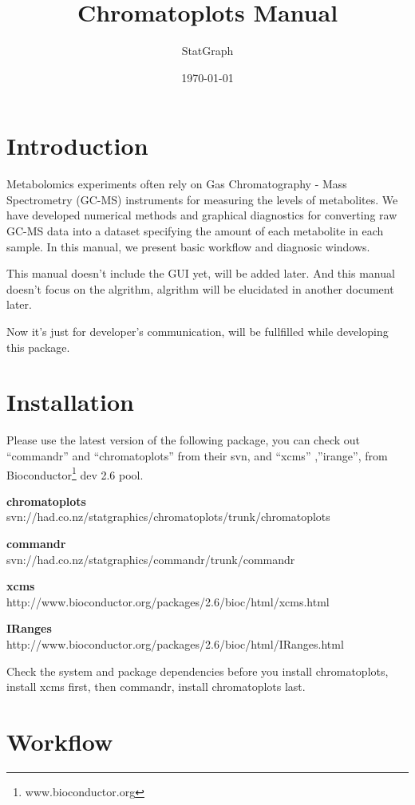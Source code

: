 \documentclass[11pt,a4paper]{article}
\title{Chromatoplots Manual}
\author{StatGraph}
\date{\today}
\begin{document}
\maketitle\newpage
\tableofcontents\newpage

\section{Introduction}
Metabolomics experiments often rely on Gas Chromatography - Mass
Spectrometry (GC-MS) instruments for measuring the levels of
metabolites. We have developed numerical methods and graphical
diagnostics for converting raw GC-MS data into a dataset specifying
the amount of each metabolite in each sample. In this manual, we
present basic workflow and diagnosic windows.

This manual doesn't include the GUI yet, will be added later. And this
manual doesn't focus on the algrithm, algrithm will be elucidated in
another document later.

Now it's just for developer's communication, will be fullfilled while
developing this package.

\section{Installation}

Please use the latest version of the following package, you can check
out ``commandr'' and ``chromatoplots'' from their svn, and ``xcms''
,''irange'', from Bioconductor\footnote[1]{www.bioconductor.org} dev 2.6 pool.

\textbf{chromatoplots}\\
svn://had.co.nz/statgraphics/chromatoplots/trunk/chromatoplots

\textbf{commandr}\\
svn://had.co.nz/statgraphics/commandr/trunk/commandr

\textbf{xcms}\\
http://www.bioconductor.org/packages/2.6/bioc/html/xcms.html

\textbf{IRanges}\\
http://www.bioconductor.org/packages/2.6/bioc/html/IRanges.html

Check the system and package dependencies before you install chromatoplots,
install xcms first, then commandr, install chromatoplots last.
\newpage

\section{Workflow}
\end{document}

